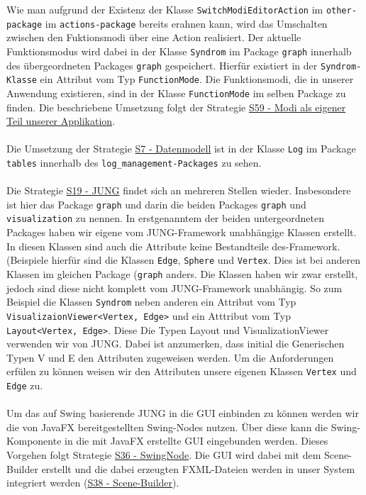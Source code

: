\documentclass[enabledeprecatedfontcommands,fontsize=11pt,paper=a4,twoside]{scrartcl}
\newcounter{one}
\begin{document}
Wie man aufgrund der Existenz der Klasse \texttt{SwitchModiEditorAction} im \texttt{other-package} im \texttt{actions-package} bereits erahnen kann, wird das Umschalten zwischen den Fuktionsmodi über eine Action realisiert. Der aktuelle Funktionsmodus wird dabei in der Klasse \texttt{Syndrom} im Package \texttt{graph} innerhalb des übergeordneten Packages \texttt{graph} gespeichert. Hierfür existiert in der \texttt{Syndrom-Klasse} ein Attribut vom Typ \texttt{FunctionMode}. Die Funktionsmodi, die in unserer Anwendung existieren, sind in der Klasse \texttt{FunctionMode} im selben Package zu finden. Die beschriebene Umsetzung folgt der Strategie \hyperlink{uuu}{S59 - Modi als eigener Teil unserer Applikation}. \\ \\

Die Umsetzung der Strategie \hyperlink{aaa}{S7 - Datenmodell} ist in der Klasse \texttt{Log} im Package \texttt{tables} innerhalb des \texttt{log\_management-Packages} zu sehen. \\ \\

Die Strategie \hyperlink{eee}{S19 - JUNG} findet sich an mehreren Stellen wieder. Insbesondere ist hier das Package \texttt{graph} und darin die beiden Packages \texttt{graph} und \texttt{visualization} zu nennen. In erstgenanntem der beiden untergeordneten Packages haben wir eigene vom JUNG-Framework unabhängige Klassen erstellt. In diesen Klassen sind auch die Attribute keine Bestandteile des-Framework. (Beispiele hierfür sind die Klassen \texttt{Edge}, \texttt{Sphere} und \texttt{Vertex}. Dies ist bei anderen Klassen im gleichen Package (\texttt{graph} anders. Die Klassen haben wir zwar erstellt, jedoch sind diese nicht komplett vom JUNG-Framework unabhängig. So zum Beispiel die Klassen \texttt{Syndrom} neben anderen ein Attribut vom Typ \texttt{VisualizaionViewer<Vertex, Edge>} und ein Atttribut vom Typ \texttt{Layout<Vertex, Edge>}. Diese Die Typen Layout und VisualizationViewer verwenden wir von JUNG. Dabei ist anzumerken, dass initial die Generischen Typen V und E den Attributen zugeweisen werden. Um die Anforderungen erfülen zu können weisen wir den Attributen unsere eigenen Klassen \texttt{Vertex} und \texttt{Edge} zu. \\ \\

Um das auf Swing basierende JUNG in die GUI einbinden zu können werden wir die von JavaFX bereitgestellten Swing-Nodes nutzen. Über diese kann die Swing-Komponente in die mit JavaFX erstellte GUI eingebunden werden. Dieses Vorgehen folgt Strategie \hyperlink{lll}{S36 - SwingNode}. Die GUI wird dabei mit dem Scene-Builder erstellt und die dabei erzeugten FXML-Dateien werden in unser System integriert werden (\hyperlink{mmm}{S38 - Scene-Builder}). \\ \\
\end{document}
